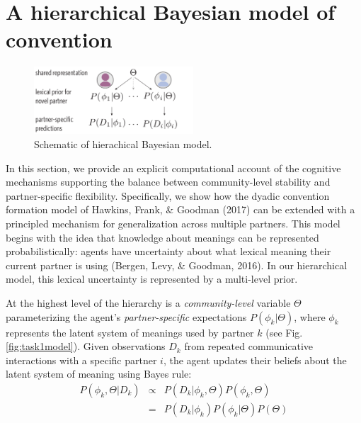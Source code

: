 \documentclass[10pt, letterpaper]{article}
\newenvironment{CodeChunk}{}{}
\begin{document}
\hypertarget{a-hierarchical-bayesian-model-of-convention}{%
\section{A hierarchical Bayesian model of
convention}\label{a-hierarchical-bayesian-model-of-convention}}

\begin{CodeChunk}
\begin{figure}[t]

{\centering \includegraphics[width=225px]{figs/task1_model} 

}

\caption{\label{fig:task1model} Schematic of hierachical Bayesian model.}\label{fig:model_schematic}
\end{figure}
\end{CodeChunk}

In this section, we provide an explicit computational account of the
cognitive mechanisms supporting the balance between community-level
stability and partner-specific flexibility. Specifically, we show how
the dyadic convention formation model of Hawkins, Frank, \& Goodman
(2017) can be extended with a principled mechanism for generalization
across multiple partners. This model begins with the idea that knowledge
about meanings can be represented probabilistically: agents have
uncertainty about what lexical meaning their current partner is using
(Bergen, Levy, \& Goodman, 2016). In our hierarchical model, this
lexical uncertainty is represented by a multi-level prior.

At the highest level of the hierarchy is a \emph{community-level}
variable \(\Theta\) parameterizing the agent's \emph{partner-specific}
expectations \(P(\phi_{k} | \Theta)\), where \(\phi_k\) represents the
latent system of meanings used by partner \(k\) (see Fig.
\ref{fig:task1model}). Given observations \(D_k\) from repeated
communicative interactions with a specific partner \(i\), the agent
updates their beliefs about the latent system of meaning using Bayes
rule: \begin{equation}
\begin{array}{rcl}
P(\phi_k, \Theta | D_k)  & \propto &  P(D_k | \phi_k, \Theta) P(\phi_k, \Theta) \\
                           & =   & P(D_k | \phi_k) P(\phi_k | \Theta) P(\Theta)
\end{array}
\end{equation}
\end{document}
